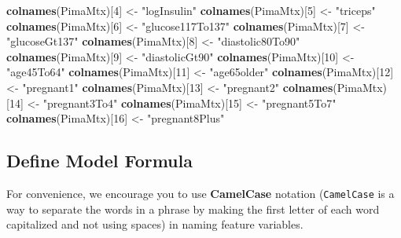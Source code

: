 \documentclass[
]{book}
\newenvironment{Shaded}{\begin{snugshade}}{\end{snugshade}}
\newcommand{\DecValTok}[1]{\textcolor[rgb]{0.00,0.00,0.81}{#1}}
\newcommand{\FunctionTok}[1]{\textcolor[rgb]{0.13,0.29,0.53}{\textbf{#1}}}
\newcommand{\NormalTok}[1]{#1}
\newcommand{\OtherTok}[1]{\textcolor[rgb]{0.56,0.35,0.01}{#1}}
\newcommand{\StringTok}[1]{\textcolor[rgb]{0.31,0.60,0.02}{#1}}
\begin{document}
\begin{Shaded}
\begin{Highlighting}[]
\FunctionTok{colnames}\NormalTok{(PimaMtx)[}\DecValTok{4}\NormalTok{] }\OtherTok{\textless{}{-}} \StringTok{"logInsulin"}
\FunctionTok{colnames}\NormalTok{(PimaMtx)[}\DecValTok{5}\NormalTok{] }\OtherTok{\textless{}{-}} \StringTok{"triceps"}
\FunctionTok{colnames}\NormalTok{(PimaMtx)[}\DecValTok{6}\NormalTok{] }\OtherTok{\textless{}{-}} \StringTok{"glucose117To137"}
\FunctionTok{colnames}\NormalTok{(PimaMtx)[}\DecValTok{7}\NormalTok{] }\OtherTok{\textless{}{-}} \StringTok{"glucoseGt137"}
\FunctionTok{colnames}\NormalTok{(PimaMtx)[}\DecValTok{8}\NormalTok{] }\OtherTok{\textless{}{-}} \StringTok{"diastolic80To90"}
\FunctionTok{colnames}\NormalTok{(PimaMtx)[}\DecValTok{9}\NormalTok{] }\OtherTok{\textless{}{-}} \StringTok{"diastolicGt90"}
\FunctionTok{colnames}\NormalTok{(PimaMtx)[}\DecValTok{10}\NormalTok{] }\OtherTok{\textless{}{-}} \StringTok{"age45To64"}
\FunctionTok{colnames}\NormalTok{(PimaMtx)[}\DecValTok{11}\NormalTok{] }\OtherTok{\textless{}{-}} \StringTok{"age65older"}
\FunctionTok{colnames}\NormalTok{(PimaMtx)[}\DecValTok{12}\NormalTok{] }\OtherTok{\textless{}{-}} \StringTok{"pregnant1"}
\FunctionTok{colnames}\NormalTok{(PimaMtx)[}\DecValTok{13}\NormalTok{] }\OtherTok{\textless{}{-}} \StringTok{"pregnant2"}
\FunctionTok{colnames}\NormalTok{(PimaMtx)[}\DecValTok{14}\NormalTok{] }\OtherTok{\textless{}{-}} \StringTok{"pregnant3To4"}
\FunctionTok{colnames}\NormalTok{(PimaMtx)[}\DecValTok{15}\NormalTok{] }\OtherTok{\textless{}{-}} \StringTok{"pregnant5To7"}
\FunctionTok{colnames}\NormalTok{(PimaMtx)[}\DecValTok{16}\NormalTok{] }\OtherTok{\textless{}{-}} \StringTok{"pregnant8Plus"}
\end{Highlighting}
\end{Shaded}

\hypertarget{define-model-formula}{%
\subsection{Define Model Formula}\label{define-model-formula}}

For convenience, we encourage you to use \textbf{CamelCase} notation (\texttt{CamelCase} is a way to separate the words in a phrase by making the first letter of each word capitalized and not using spaces) in naming feature variables.
\end{document}
